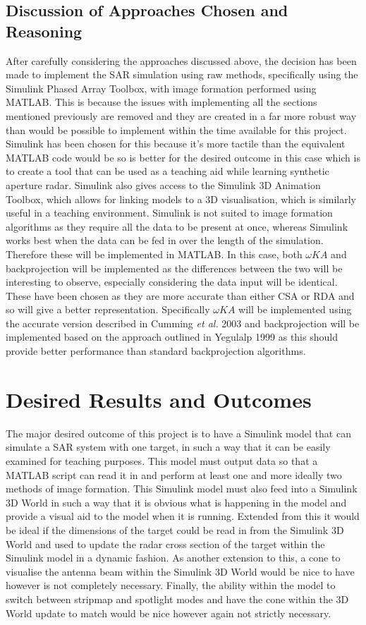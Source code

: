 \subsection{Discussion of Approaches Chosen and Reasoning}
\label{subsec:approach_chosen}
After carefully considering the approaches discussed above, the decision has been made to implement the SAR simulation using raw methods, specifically using the Simulink Phased Array Toolbox, with image formation performed using MATLAB. This is because the issues with implementing all the sections mentioned previously are removed and they are created in a far more robust way than would be possible to implement within the time available for this project. Simulink has been chosen for this because it's more tactile than the equivalent MATLAB code would be so is better for the desired outcome in this case which is to create a tool that can be used as a teaching aid while learning synthetic aperture radar. Simulink also gives access to the Simulink 3D Animation Toolbox, which allows for linking models to a 3D visualisation, which is similarly useful in a teaching environment. Simulink is not suited to image formation algorithms as they require all the data to be present at once, whereas Simulink works best when the data can be fed in over the length of the simulation. Therefore these will be implemented in MATLAB. In this case, both $\omega KA$ and backprojection will be implemented as the differences between the two will be interesting to observe, especially considering the data input will be identical. These have been chosen as they are more accurate than either CSA or RDA and so will give a better representation. Specifically $\omega KA$ will be implemented using the accurate version described in Cumming \textit{et al.} 2003 \cite{cummingInterpretationsOmegaKAlgorithm2003} and backprojection will be implemented based on the approach outlined in Yegulalp 1999 \cite{yegulalpFastBackprojectionAlgorithm1999} as this should provide better performance than standard backprojection algorithms.
\section{Desired Results and Outcomes}
The major desired outcome of this project is to have a Simulink model that can simulate a SAR system with one target, in such a way that it can be easily examined for teaching purposes. This model must output data so that a MATLAB script can read it in and perform at least one and more ideally two methods of image formation. This Simulink model must also feed into a Simulink 3D World in such a way that it is obvious what is happening in the model and provide a visual aid to the model when it is running. Extended from this it would be ideal if the dimensions of the target could be read in from the Simulink 3D World and used to update the radar cross section of the target within the Simulink model in a dynamic fashion. As another extension to this, a cone to visualise the antenna beam within the Simulink 3D World would be nice to have however is not completely necessary. Finally, the ability within the model to switch between stripmap and spotlight modes and have the cone within the 3D World update to match would be nice however again not strictly necessary. 
